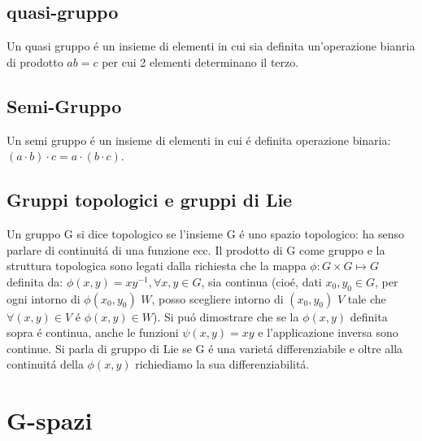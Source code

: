\documentclass[oneside,12pt]{memoir}
\begin{document}
\subsection{quasi-gruppo}

Un quasi gruppo \'e un insieme di elementi in cui sia definita un'operazione bianria di prodotto $ab=c$ per cui 2 elementi determinano il terzo.

\subsection{Semi-Gruppo}

Un semi gruppo \'e un insieme di elementi in cui \'e definita operazione binaria: $(a\cdot b)\cdot c=a\cdot(b\cdot c)$.

\subsection{Gruppi topologici e gruppi di Lie}

Un gruppo G si dice topologico se l'insieme G \'e uno spazio topologico:
ha senso parlare di continuit\'a di una funzione ecc.
Il prodotto di G come gruppo e la struttura topologica sono legati dalla richiesta che la mappa $\phi:G\times G\mapsto G$ definita da: $\phi(x,y)=xy^{-1} ,\forall x,y \in G$, sia continua (cio\'e, dati $x_0,y_0\in G$, per ogni intorno di $\phi(x_0,y_0)$ $W$, posso scegliere intorno di $(x_0,y_0)$ $V$ tale che $\forall (x,y)\in V$ \'e $\phi(x,y) \in W$). Si pu\'o dimostrare che se la $\phi(x,y)$ definita sopra \'e continua, anche le funzioni $\psi(x,y)=xy$ e l'applicazione inversa sono continue.
Si parla di gruppo di Lie se G \'e una variet\'a differenziabile e oltre alla continuit\'a della $\phi(x,y)$ richiediamo la sua differenziabilit\'a. 



\section{G-spazi}
\end{document}
